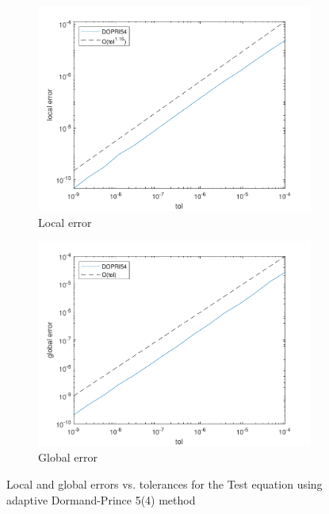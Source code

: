 \begin{figure}[H]
\centering
    \begin{subfigure}{0.49\linewidth}
        \includegraphics[width=\linewidth]{images/7/7_3_localerror.pdf}
        \caption{Local error}
    \end{subfigure}
    \begin{subfigure}{0.49\linewidth}
        \includegraphics[width=\linewidth]{images/7/7_3_globalerror.pdf}
        \caption{Global error}
    \end{subfigure}
    \caption{Local and global errors vs. tolerances for the Test equation using adaptive Dormand-Prince 5(4) method}
    \label{7_3_TE_errors}
\end{figure}

